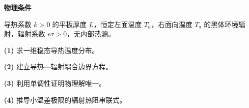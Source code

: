 \textbf{物理条件}\par 导热系数 \(k>0\) 的平板厚度 \(L\)，恒定左面温度 \(T_h\)，右面向温度 \(T_a\) 的黑体环境辐射，辐射系数 \(\epsilon\sigma>0\)，无内部热源。
\par\noindent\textbf{(1)} 求一维稳态导热温度分布。
\par\noindent\textbf{(2)} 建立导热—辐射耦合边界方程。
\par\noindent\textbf{(3)} 利用单调性证明物理解唯一。
\par\noindent\textbf{(4)} 推导小温差极限的辐射热阻串联式。
